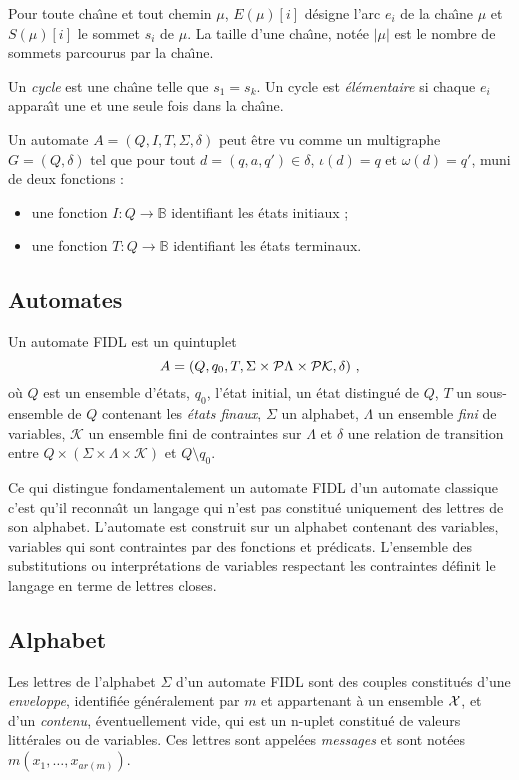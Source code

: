 Pour toute cha\^{\i}ne et tout chemin $\mu{}$, $E(\mu{})[i]$ d\'esigne
l'arc $e_i$ de la cha\^{\i}ne $\mu{}$ et $S(\mu{})[i]$ le sommet $s_i$ de
$\mu{}$. La taille d'une cha\^{\i}ne, not\'ee $\vert \mu{}\vert$ est le
nombre de sommets parcourus par la cha\^{\i}ne. 

Un \emph{cycle} est une cha\^{\i}ne telle que $s_1 = s_k$. Un cycle est
\emph{\'el\'ementaire} si chaque $e_i$ appara\^{\i}t une et une seule
fois dans la cha\^{\i}ne.  

Un automate $A=(Q,I,T,\Sigma,\delta)$ peut \^etre vu comme  un
multigraphe $G=(Q,\delta)$ tel que pour tout $d=(q,a,q') \in \delta$,
$\iota(d) =q$ et $\omega(d) = q'$, muni de deux fonctions :
\begin{itemize}
  \item une fonction $I:Q\rightarrow \mathbb{B}$ identifiant les
  \'etats initiaux ;
\item une fonction $T:Q\rightarrow \mathbb{B}$ identifiant les
  \'etats terminaux. 
\end{itemize}

\subsection{Automates}

\begin{definition}
Un automate \textsf{FIDL} est un quintuplet
$$A = (Q,q_0,T,\Sigma \times{}{\cal P}\Lambda \times{}{\cal P}\mathcal{K},\delta)\ ,$$
o\`u $Q$
est un ensemble d'\'etats, $q_0$, l'\'etat initial, un \'etat distingu\'e de
$Q$, $T$ un sous-ensemble de $Q$ contenant les \emph{\'etats finaux}, $\Sigma$
un alphabet, $\Lambda$ un ensemble \emph{fini}
de variables, $\mathcal{K}$ un ensemble
fini de contraintes sur $\Lambda$ et
$\delta$ une relation de transition entre $Q \times{}(\Sigma \times{}\Lambda \times{}\mathcal{K})$ et $Q\setminus q_0$.
\end{definition}

Ce qui distingue fondamentalement un automate \textsf{FIDL} d'un
automate classique c'est qu'il reconna\^{\i}t un langage qui n'est pas
constitu\'e uniquement des lettres de son alphabet. L'automate est
construit sur un alphabet contenant
des variables, variables qui sont contraintes par des fonctions et
pr\'edicats. L'ensemble des substitutions ou interpr\'etations de
variables respectant les contraintes d\'efinit le langage en terme de
lettres \og closes\fg.

\subsection{Alphabet}
\label{sec:alphabet}
Les lettres de l'alphabet $\Sigma$ d'un automate \textsf{FIDL}  sont
des couples constitu\'es d'une \emph{enveloppe}, identifi\'ee
g\'en\'eralement par $m$ et appartenant \`a un ensemble ${\cal X}$, et 
d'un \emph{contenu}, \'eventuellement vide, qui est un n-uplet
constitu\'e de valeurs litt\'erales ou de variables. Ces lettres sont appel\'ees
\emph{messages} et sont not\'ees $m(x_1,\dots,x_{ar(m)})$.

